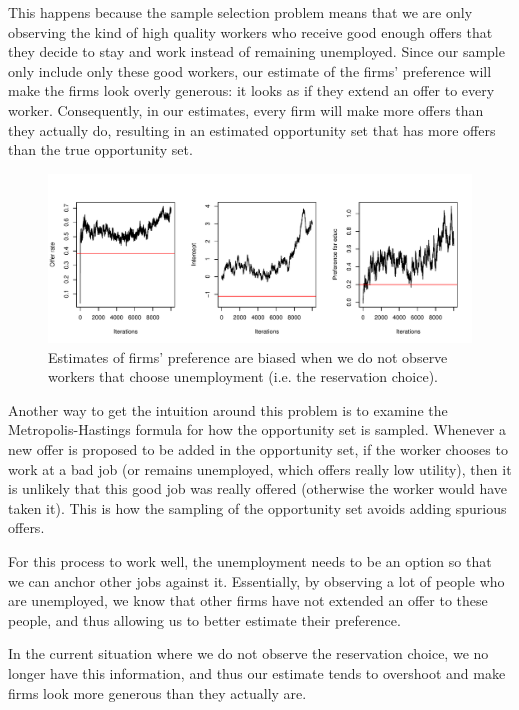 This happens because the sample selection problem means that we are only
observing the kind of high quality workers who receive good enough offers that
they decide to stay and work instead of remaining unemployed. Since our sample
only include only these good workers, our estimate of the firms' preference will
make the firms look overly generous: it looks as if they extend an offer to
every worker. Consequently, in our estimates, every firm will make more offers
than they actually do, resulting in an estimated opportunity set that has more
offers than the true opportunity set.

\begin{figure}[tbp]
  \centering
  \includegraphics[width=\textwidth,keepaspectratio]{../figure/sim_labor_nojobs_nounemp_managerial}
  \caption[Estimates of firms' preference when the reservation choice is
  unobserved.]{Estimates of firms' preference are biased when we do not observe
    workers that choose unemployment (i.e. the reservation choice).}
  \label{fig:sim_labor_nojobs_nounemp_managerial}
\end{figure}

Another way to get the intuition around this problem is to examine the
Metropolis-Hastings formula for how the opportunity set is sampled. Whenever a
new offer is proposed to be added in the opportunity set, if the worker chooses
to work at a bad job (or remains unemployed, which offers really low utility),
then it is unlikely that this good job was really offered (otherwise the worker
would have taken it). This is how the sampling of the opportunity set avoids
adding spurious offers.

For this process to work well, the unemployment needs to be an option so that we
can anchor other jobs against it. Essentially, by observing a lot of people who
are unemployed, we know that other firms have not extended an offer to these
people, and thus allowing us to better estimate their preference.

In the current situation where we do not observe the reservation choice, we no
longer have this information, and thus our estimate tends to overshoot and make
firms look more generous than they actually are.

